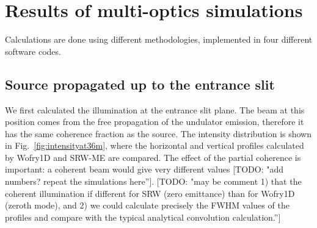 \documentclass{iucr}              %
\newcommand{\todo}[1]{{\color{red}[TODO: "#1'']}}
\begin{document}
\section{Results of multi-optics simulations}
\label{sec:complete-beamline}

Calculations are done using different methodologies, implemented in four different software codes. 

\subsection{Source propagated up to the entrance slit}

We first calculated the illumination at the entrance slit plane. The beam at this position comes from the free propagation of the undulator emission, therefore it has the same coherence fraction as the source. The intensity distribution is shown in Fig.~\ref{fig:intensityat36m}, where the horizontal and vertical profiles calculated by Wofry1D and SRW-ME are compared. The effect of the partial coherence is important: a coherent beam would give very different values \todo{add numbers? repeat the simulations here}. \todo{may be comment 1) that the coherent illumination if different for SRW (zero emittance) than for Wofry1D (zeroth mode), and 2) we could calculate precisely the FWHM values of the profiles and compare with the typical analytical convolution calculation.}   
\end{document}
